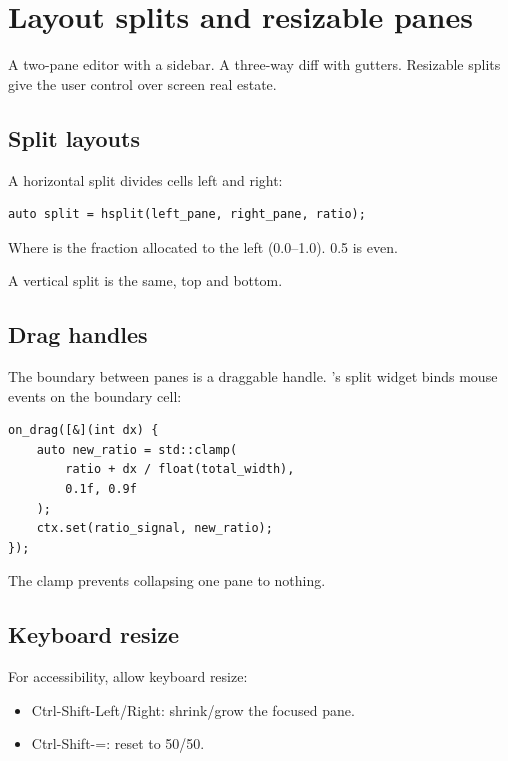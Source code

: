 \chapter{Layout splits and resizable panes}
\label{ch:splits}

\begin{aside}
A two-pane editor with a sidebar. A three-way diff with
gutters. Resizable splits give the user control over screen
real estate.
\end{aside}

\section{Split layouts}

A horizontal split divides cells left and right:

\begin{lstlisting}
auto split = hsplit(left_pane, right_pane, ratio);
\end{lstlisting}

Where  is the fraction allocated to the left
(0.0--1.0). 0.5 is even.

A vertical split is the same, top and bottom.

\section{Drag handles}

The boundary between panes is a draggable handle. \maya{}'s
split widget binds mouse events on the boundary cell:

\begin{lstlisting}
on_drag([&](int dx) {
    auto new_ratio = std::clamp(
        ratio + dx / float(total_width),
        0.1f, 0.9f
    );
    ctx.set(ratio_signal, new_ratio);
});
\end{lstlisting}

The clamp prevents collapsing one pane to nothing.

\section{Keyboard resize}

For accessibility, allow keyboard resize:

\begin{itemize}[leftmargin=*]
  \item Ctrl-Shift-Left/Right: shrink/grow the focused
    pane.
  \item Ctrl-Shift-=: reset to 50/50.
\end{itemize}

